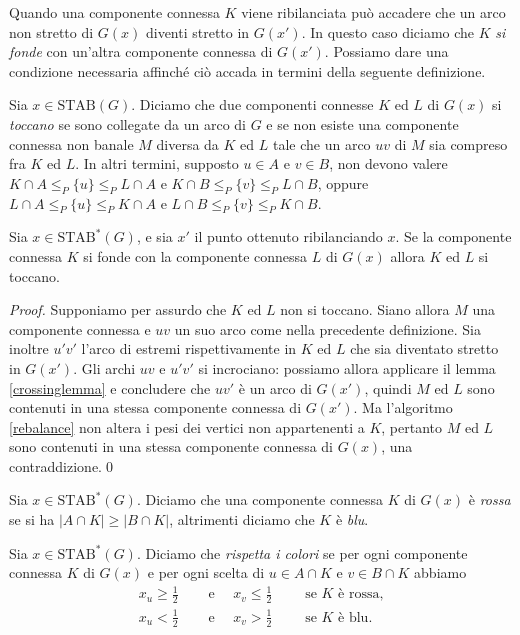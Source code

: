 Quando una componente connessa \(K\) viene ribilanciata pu\`o accadere che un arco non stretto di \(G(x)\) diventi stretto in \(G(x')\). In questo caso diciamo che \(K\) \emph{si fonde} con un'altra componente connessa di \(G(x')\). Possiamo dare una condizione necessaria affinch\'e ci\`o accada in termini della seguente definizione. 
\begin{definition}
	Sia \(x\in\text{STAB}(G)\). Diciamo che due componenti connesse \(K\) ed \(L\) di \(G(x)\) si \emph{toccano} se sono collegate da un arco di \(G\) e se non esiste una componente connessa non banale \(M\) diversa da \(K\) ed \(L\) tale che un arco \(uv\) di \(M\) sia compreso fra \(K\) ed \(L\). In altri termini, supposto \(u\in A\) e \(v\in B\), non devono valere \(K\cap A\le_{P}\{u\}\le_{P}L\cap A\) e \(K\cap B\le_{P}\{v\}\le_{P}L\cap B\), oppure \(L\cap A\le_{P}\{u\}\le_{P}K\cap A\) e \(L\cap B\le_{P}\{v\}\le_{P}K\cap B\). 
\end{definition}
\begin{lemma}
	\label{touchinglemma} Sia \(x\in\text{STAB}^{*}(G)\), e sia \(x'\) il punto ottenuto ribilanciando \(x\). Se la componente connessa \(K\) si fonde con la componente connessa \(L\) di \(G(x)\) allora \(K\) ed \(L\) si toccano. 
\end{lemma}
\begin{proof}
	Supponiamo per assurdo che \(K\) ed \(L\) non si toccano. Siano allora \(M\) una componente connessa e \(uv\) un suo arco come nella precedente definizione. Sia inoltre \(u'v'\) l'arco di estremi rispettivamente in \(K\) ed \(L\) che sia diventato stretto in \(G(x')\). Gli archi \(uv\) e \(u'v'\) si incrociano: possiamo allora applicare il lemma \ref{crossinglemma} e concludere che \(uv'\) \`e un arco di \(G(x')\), quindi \(M\) ed \(L\) sono contenuti in una stessa componente connessa di \(G(x')\). Ma l'algoritmo \ref{rebalance} non altera i pesi dei vertici non appartenenti a \(K\), pertanto \(M\) ed \(L\) sono contenuti in una stessa componente connessa di \(G(x)\), una contraddizione.\qed 
\end{proof}
\begin{definition}
	Sia \(x\in\text{STAB}^{*}(G)\). Diciamo che una componente connessa \(K\) di \(G(x)\) è \emph{rossa} se si ha \(|A\cap K|\ge|B\cap K|\), altrimenti diciamo che \(K\) è \emph{blu}. 
\end{definition}
\begin{definition}
	Sia \(x\in\text{STAB}^{*}(G)\). Diciamo che \emph{rispetta i colori} se per ogni componente connessa \(K\) di \(G(x)\) e per ogni scelta di \(u\in A\cap K\) e \(v\in B\cap K\) abbiamo 
	\begin{align}
		x_u\ge\frac{1}{2}&\quad\text{ e }\quad x_v\le\frac{1}{2}\qquad\text{ se }K\text{ \`e rossa,} \nonumber \\
		x_u<\frac{1}{2}&\quad\text{ e }\quad x_v>\frac{1}{2}\qquad\text{ se }K\text{ \`e blu.} \nonumber 
	\end{align}
\end{definition}
